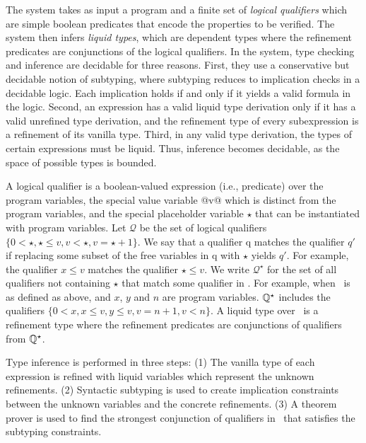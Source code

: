 The system takes as input a program and 
a finite set of \textit{logical qualifiers}
which are simple boolean predicates 
that encode the properties to be verified. 
The system then infers
\textit{liquid types}, which are dependent types where the refinement predicates are conjunctions of the logical qualifiers.
In the system, type checking and inference are decidable for
three reasons. 
%
First, they use a conservative but decidable
notion of subtyping, where 
subtyping reduces to implication checks in a decidable logic.
Each implication holds if and only if it yields a valid formula in
the logic. 
%
Second, an expression has a valid liquid type derivation
only if it has a valid unrefined type derivation, and the refinement 
type of every subexpression is a refinement of its vanilla type. 
%
Third, in any valid type derivation, the types of certain expressions
must be liquid. Thus, inference becomes decidable, as the space of
possible types is bounded. 


A logical qualifier is a
boolean-valued expression (i.e., predicate) over the program variables, 
the special value variable @v@ which is distinct from the
program variables, and the special placeholder variable $\star$ that
can be instantiated with program variables. 
Let $\mathcal{Q}$ be the set of logical qualifiers
$\{0 < \star, \star \leq v, v < \star,  v = \star + 1\}$. 
%
We say that
a qualifier q matches the qualifier $q'$
if replacing some subset of
the free variables in q with $\star$ yields $q'$.
For example, the qualifier
$x \leq v$ matches the qualifier $\star \leq v$. 
We write $\mathcal{Q}^\star$
for the set of all
qualifiers not containing $\star$ that match some qualifier in \qset. 
For example, when \qset\ is as defined as above, 
and $x$, $y$ and $n$ are program variables.
$\mathbb{Q}^\star$
includes the qualifiers
$\{0 < x, x \leq v, y \leq v, v = n + 1, v <n\}$. 
A liquid type over \qset\ is a refinement type where the refinement predicates are
conjunctions of qualifiers from $\mathbb{Q} ^ \star$.

Type inference is performed in three steps:
(1) The vanilla type of each expression is refined with liquid variables
which represent the unknown refinements.
(2) Syntactic subtyping is used to create implication constraints 
between the unknown variables and the concrete refinements.
(3) A theorem prover is used to find the strongest conjunction
of qualifiers in \qset\
that satisfies the subtyping constraints.   

